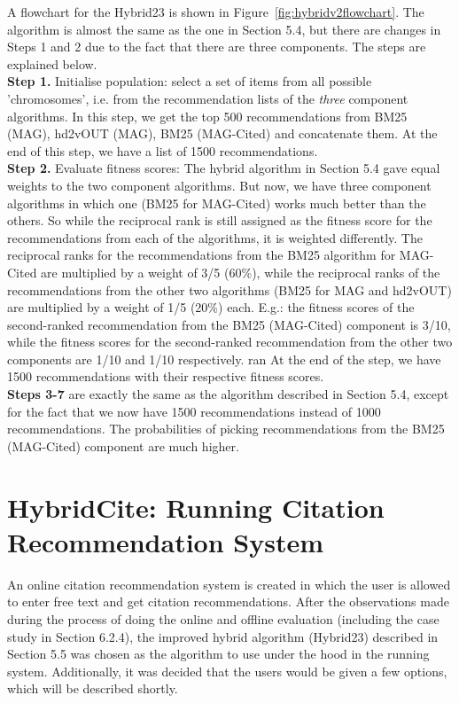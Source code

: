 A flowchart for the Hybrid23 is shown in Figure~\ref{fig:hybridv2flowchart}.
The algorithm is almost the same as the one in Section 5.4, but there are changes in Steps 1 and 2 due to the fact that there are three components. The steps are explained below.\\
\textbf{Step 1.} Initialise population: select a set of items from all possible 'chromosomes', i.e. from the recommendation lists of the \textit{three} component algorithms. In this step, we get the top 500 recommendations from BM25 (MAG), hd2vOUT (MAG), BM25 (MAG-Cited) and concatenate them. At the end of this step, we have a list of 1500 recommendations.\\
\textbf{Step 2.} Evaluate fitness scores: The hybrid algorithm in Section 5.4 gave equal weights to the two component algorithms. But now, we have three component algorithms in which one (BM25 for MAG-Cited) works much better than the others. So while the reciprocal rank is still assigned as the fitness score for the recommendations from each of the algorithms, it is weighted differently. The reciprocal ranks for the recommendations from the BM25 algorithm for MAG-Cited are multiplied by a weight of 3/5 (60\%), while the reciprocal ranks of the recommendations from the other two algorithms (BM25 for MAG and hd2vOUT) are multiplied by a weight of 1/5 (20\%) each. 
E.g.: the fitness scores of the second-ranked recommendation from the BM25 (MAG-Cited) component is 3/10, while the fitness scores for the second-ranked recommendation from the other two components are 1/10 and 1/10 respectively. ran At the end of the step, we have 1500 recommendations with their respective fitness scores.\\
\textbf{Steps 3-7} are exactly the same as the algorithm described in Section 5.4, except for the fact that we now have 1500 recommendations instead of 1000 recommendations. The probabilities of picking recommendations from the BM25 (MAG-Cited) component are much higher.

\section{HybridCite: Running Citation Recommendation System}
An online citation recommendation system is created in which the user is allowed to enter free text and get citation recommendations. 
After the observations made during the process of doing the online and offline evaluation (including the case study in Section 6.2.4), the improved hybrid algorithm (Hybrid23) described in Section 5.5 was chosen as the algorithm to use under the hood in the running system. Additionally, it was decided that the users would be given a few options, which will be described shortly.

